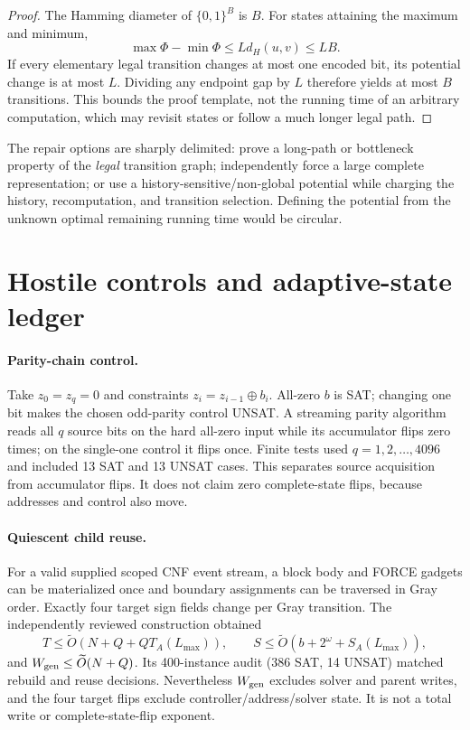 \documentclass[11pt]{article}
\newcommand{\bits}{\{0,1\}}
\begin{document}
\begin{proof}
The Hamming diameter of $\bits^B$ is $B$.  For states attaining the maximum and minimum,
\[
 \max\Phi-\min\Phi\le Ld_H(u,v)\le LB.
\]
If every elementary legal transition changes at most one encoded bit, its potential change is at most $L$.  Dividing any endpoint gap by $L$ therefore yields at most $B$ transitions.  This bounds the proof template, not the running time of an arbitrary computation, which may revisit states or follow a much longer legal path.
\end{proof}

The repair options are sharply delimited: prove a long-path or bottleneck property of the \emph{legal} transition graph; independently force a large complete representation; or use a history-sensitive/non-global potential while charging the history, recomputation, and transition selection.  Defining the potential from the unknown optimal remaining running time would be circular.

\section{Hostile controls and adaptive-state ledger}

\paragraph{Parity-chain control.}
Take $z_0=z_q=0$ and constraints $z_i=z_{i-1}\oplus b_i$.  All-zero $b$ is SAT; changing one bit makes the chosen odd-parity control UNSAT.  A streaming parity algorithm reads all $q$ source bits on the hard all-zero input while its accumulator flips zero times; on the single-one control it flips once.  Finite tests used $q=1,2,\ldots,4096$ and included 13 SAT and 13 UNSAT cases.  This separates source acquisition from accumulator flips.  It does not claim zero complete-state flips, because addresses and control also move.

\paragraph{Quiescent child reuse.}
For a valid supplied scoped CNF event stream, a block body and FORCE gadgets can be materialized once and boundary assignments can be traversed in Gray order.  Exactly four target sign fields change per Gray transition.  The independently reviewed construction obtained
\[
 T\le\widetilde O(N+Q+QT_A(L_{\max})),\qquad
 S\le\widetilde O(b+2^\omega+S_A(L_{\max})),
\]
and $W_{\rm gen}\le\widetilde O(N+Q)$.  Its 400-instance audit (386 SAT, 14 UNSAT) matched rebuild and reuse decisions.  Nevertheless $W_{\rm gen}$ excludes solver and parent writes, and the four target flips exclude controller/address/solver state.  It is not a total write or complete-state-flip exponent.
\end{document}
